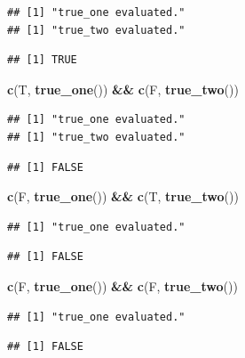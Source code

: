 \documentclass[]{book}
\newenvironment{Shaded}{\begin{snugshade}}{\end{snugshade}}
\newcommand{\KeywordTok}[1]{\textcolor[rgb]{0.13,0.29,0.53}{\textbf{#1}}}
\newcommand{\NormalTok}[1]{#1}
\newcommand{\OperatorTok}[1]{\textcolor[rgb]{0.81,0.36,0.00}{\textbf{#1}}}
\newcommand{\StringTok}[1]{\textcolor[rgb]{0.31,0.60,0.02}{#1}}
\begin{document}
\begin{verbatim}
## [1] "true_one evaluated."
## [1] "true_two evaluated."
\end{verbatim}

\begin{verbatim}
## [1] TRUE
\end{verbatim}

\begin{Shaded}
\begin{Highlighting}[]
\KeywordTok{c}\NormalTok{(T, }\KeywordTok{true_one}\NormalTok{()) }\OperatorTok{&&}\StringTok{ }\KeywordTok{c}\NormalTok{(F, }\KeywordTok{true_two}\NormalTok{())}
\end{Highlighting}
\end{Shaded}

\begin{verbatim}
## [1] "true_one evaluated."
## [1] "true_two evaluated."
\end{verbatim}

\begin{verbatim}
## [1] FALSE
\end{verbatim}

\begin{Shaded}
\begin{Highlighting}[]
\KeywordTok{c}\NormalTok{(F, }\KeywordTok{true_one}\NormalTok{()) }\OperatorTok{&&}\StringTok{ }\KeywordTok{c}\NormalTok{(T, }\KeywordTok{true_two}\NormalTok{()) }
\end{Highlighting}
\end{Shaded}

\begin{verbatim}
## [1] "true_one evaluated."
\end{verbatim}

\begin{verbatim}
## [1] FALSE
\end{verbatim}

\begin{Shaded}
\begin{Highlighting}[]
\KeywordTok{c}\NormalTok{(F, }\KeywordTok{true_one}\NormalTok{()) }\OperatorTok{&&}\StringTok{ }\KeywordTok{c}\NormalTok{(F, }\KeywordTok{true_two}\NormalTok{()) }
\end{Highlighting}
\end{Shaded}

\begin{verbatim}
## [1] "true_one evaluated."
\end{verbatim}

\begin{verbatim}
## [1] FALSE
\end{verbatim}
\end{document}
